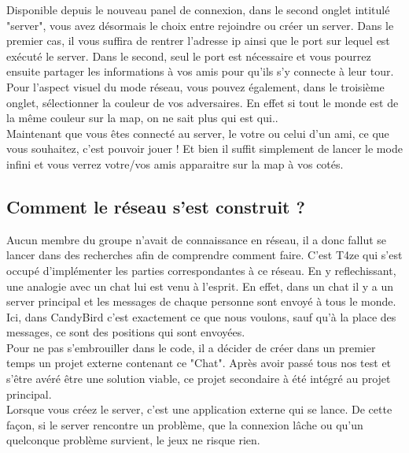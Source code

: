 \documentclass [11pt]{report}
\begin{document}
		Disponible depuis le nouveau panel de connexion, dans le second onglet intitulé "server", vous avez désormais le choix entre rejoindre ou créer un server. Dans le premier cas, il vous suffira de rentrer l'adresse ip ainsi que le port sur lequel est exécuté le server. Dans le second, seul le port est nécessaire et vous pourrez ensuite partager les informations à vos amis pour qu'ils s'y connecte à leur tour. Pour l'aspect visuel du mode réseau, vous pouvez également, dans le troisième onglet, sélectionner la couleur de vos adversaires. En effet si tout le monde est de la même couleur sur la map, on ne sait plus qui est qui..\\		
		
		Maintenant que vous êtes connecté au server, le votre ou celui d'un ami, ce que vous souhaitez,  c'est pouvoir jouer ! Et bien il suffit simplement de lancer le mode infini et vous verrez votre/vos amis apparaitre sur la map à vos cotés.\\
				
				
		\vspace{10mm}
		
		
		\subsection{Comment le réseau s'est construit ?}
		
		Aucun membre du groupe n'avait de connaissance en réseau, il a donc fallut se lancer dans des recherches afin de comprendre comment faire. C'est T4ze qui s'est occupé d'implémenter les parties correspondantes à ce réseau. En y reflechissant, une analogie avec un chat lui est venu à l'esprit. En effet, dans un chat il y a un server principal et les messages de chaque personne sont envoyé à tous le monde. Ici, dans CandyBird c'est exactement ce que nous voulons, sauf qu'à la place des messages, ce sont des positions qui sont envoyées.\\
		
		Pour ne pas s'embrouiller dans le code, il a décider de créer dans un premier temps un projet externe contenant ce "Chat". Après avoir passé tous nos test et s'être avéré être une solution viable, ce projet secondaire à été intégré au projet principal.\\
		
		Lorsque vous créez le server, c'est une application externe qui se lance. De cette façon, si le server rencontre un problème, que la connexion lâche ou qu'un quelconque problème survient, le jeux ne risque rien. \\
				
\end{document}
